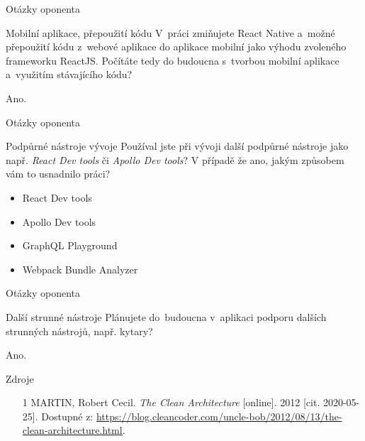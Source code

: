 \documentclass[czech,aspectratio=169]{beamer}
\begin{document}

\begin{frame}[noframenumbering]{Otázky oponenta}
    \begin{block}{Mobilní aplikace, přepoužití kódu}
        V~práci zmiňujete React Native a~možné přepoužití kódu z~webové aplikace do aplikace mobilní jako výhodu zvoleného frameworku ReactJS. Počítáte tedy do budoucna s~tvorbou mobilní aplikace a~využitím stávajícího kódu?
    \end{block}
    \vfill

    Ano.
\end{frame}

\begin{frame}[noframenumbering]{Otázky oponenta}

    \begin{block}{Podpůrné nástroje vývoje}
        Používal jste při vývoji další podpůrné nástroje jako např. \emph{React Dev tools} či \emph{Apollo Dev tools}? V případě že ano, jakým způsobem vám to usnadnilo práci?
    \end{block}
    \vfill

    \begin{itemize}
        \item React Dev tools
        \item Apollo Dev tools
        \item GraphQL Playground
        \item Webpack Bundle Analyzer
    \end{itemize}
\end{frame}

\begin{frame}[noframenumbering]{Otázky oponenta}
    \begin{block}{Další strunné nástroje}
        Plánujete do~budoucna v~aplikaci podporu dalších strunných nástrojů, např. kytary?
    \end{block}

    \vfill

    Ano.
\end{frame}


\begin{frame}{Zdroje}
    \begin{itemize}
        \item [1] MARTIN, Robert Cecil. \emph{The Clean Architecture} [online]. 2012 [cit. 2020-05-25]. Dostupné z: \url{https://blog.cleancoder.com/uncle-bob/2012/08/13/the-clean-architecture.html}.
    \end{itemize}
\end{frame}
\end{document}
